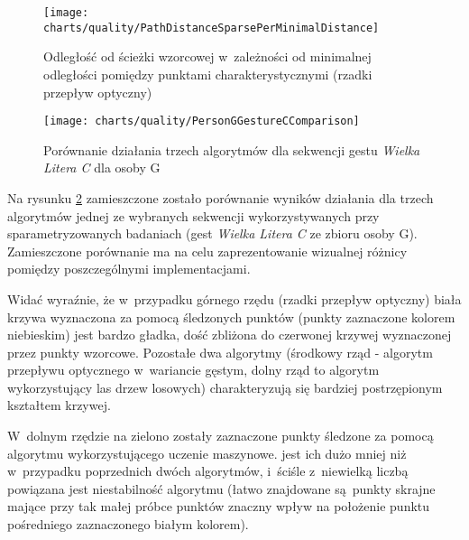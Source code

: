       \begin{figure}[!ht]
        \centering
        \texttt{[image: charts/quality/PathDistanceSparsePerMinimalDistance]}
        \caption[Odległość od ścieżki wzorcowej w~zależności od minimalnej odległości pomiędzy punktami
                 charakterystycznymi]
                {Odległość od ścieżki wzorcowej w~zależności od minimalnej odległości pomiędzy punktami
                 charakterystycznymi (rzadki przepływ optyczny)}
        \label{fig:SpecialisedSparsePathDistance}
      \end{figure}

    \newpage

      \begin{figure}[!ht]
        \centering
        \texttt{[image: charts/quality/PersonGGestureCComparison]}
        \caption[Porównanie działania 3 algorytmów dla sekwencji gestu C dla osoby G]
                {Porównanie działania trzech algorytmów dla sekwencji gestu \textit{Wielka Litera C} dla osoby G}
        \label{fig:PersonGGestureCComparison}
      \end{figure}

    \newpage

    Na rysunku \ref{fig:PersonGGestureCComparison} zamieszczone zostało porównanie wyników działania dla trzech algorytmów jednej ze wybranych sekwencji wykorzystywanych przy sparametryzowanych badaniach (gest \textit{Wielka Litera C} ze zbioru osoby G). Zamieszczone porównanie ma na celu zaprezentowanie wizualnej różnicy pomiędzy poszczególnymi implementacjami.

    Widać wyraźnie, że w~przypadku górnego rzędu (rzadki przepływ optyczny) biała krzywa wyznaczona za pomocą śledzonych punktów (punkty zaznaczone kolorem niebieskim) jest bardzo gładka, dość zbliżona do czerwonej krzywej wyznaczonej przez punkty wzorcowe. Pozostałe dwa algorytmy (środkowy rząd - algorytm przepływu optycznego w~wariancie gęstym, dolny rząd to algorytm wykorzystujący las drzew losowych) charakteryzują się bardziej postrzępionym kształtem krzywej.

    W~dolnym rzędzie na zielono zostały zaznaczone punkty śledzone za pomocą algorytmu wykorzystującego uczenie maszynowe. jest ich dużo mniej niż w~przypadku poprzednich dwóch algorytmów, i~ściśle z~niewielką liczbą powiązana jest niestabilność algorytmu (łatwo znajdowane są~punkty skrajne mające przy tak małej próbce punktów znaczny wpływ na położenie punktu pośredniego zaznaczonego białym kolorem).

